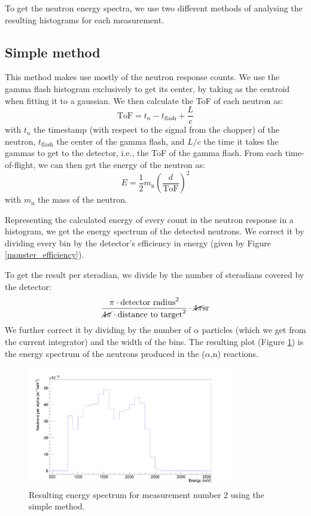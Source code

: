 \documentclass[a4paper,12pt]{report}
\newcommand{\an}{($\alpha$,n) }
\begin{document}
To get the neutron energy spectra, we use two different methods of analysing the resulting histograms for each measurement.

\subsection{Simple method}
This method makes use mostly of the neutron response counts.
We use the gamma flash histogram exclusively to get its center, by taking as the centroid when fitting it to a gaussian.
We then calculate the ToF of each neutron as:
\begin{equation}
	\text{ToF} = t_n-t_\text{flash}+\frac{L}{c}
\end{equation}
with $t_n$ the timestamp (with respect to the signal from the chopper) of the neutron, $t_\text{flash}$ the center of the gamma flash, and $L/c$ the time it takes the gammas to get to the detector, i.e., the ToF of the gamma flash.
From each time-of-flight, we can then get the energy of the neutron as:
\begin{equation}
	E=\frac{1}{2} m_\text{n} \left( \frac{d}{\text{ToF}} \right)^2
\end{equation}
with $m_\text{n}$ the mass of the neutron.

Representing the calculated energy of every count in the neutron response in a histogram, we get the energy spectrum of the detected neutrons.
We correct it by dividing every bin by the detector's efficiency in energy (given by Figure \ref{monster_efficiency}).

To get the result per steradian, we divide by the number of steradians covered by the detector:
\[ \frac{\pi \cdot \text{detector radius}^2}{\cancel{4 \pi} \cdot \text{distance to target}^2}\cdot \cancel{4\pi}\unit{sr}  \]
We further correct it by dividing by the number of $\alpha$ particles (which we get from the current integrator) and the width of the bins.
The resulting plot (Figure \ref{pulsed_energysimple}) is the energy spectrum of the neutrons produced in the \an reactions.

\begin{figure}[H]
	\centering
	\includegraphics[width=0.80\textwidth]{pulsed_energysimple.png}
	\caption{Resulting energy spectrum for measurement number 2 using the simple method.}
	\label{pulsed_energysimple}
\end{figure}
\end{document}
